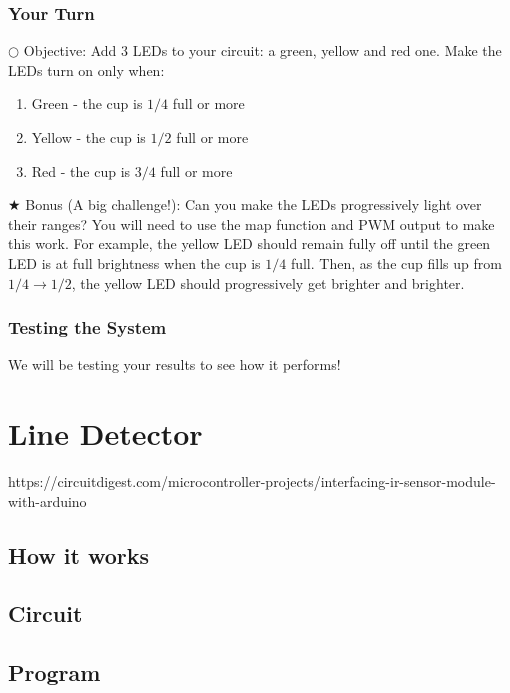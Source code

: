 \documentclass[12pt]{article}
\begin{document}
\subsubsection{Your Turn}

\noindent $\bigcirc$ Objective: Add 3 LEDs to your circuit: a green, yellow and red one. Make the LEDs turn on only when:
\begin{enumerate}
	\itemsep -1em
	\item Green - the cup is $1/4$ full or more
	\item Yellow - the cup is $1/2$ full or more
	\item Red - the cup is $3/4$ full or more
\end{enumerate}

\noindent $\bigstar$ Bonus (A big challenge!): Can you make the LEDs progressively light over their ranges? You will need to use the map function and PWM output to make this work. For example, the yellow LED should remain fully off until the green LED is at full brightness when the cup is $1/4$ full. Then, as the cup fills up from $1/4 \rightarrow 1/2$, the yellow LED should progressively get brighter and brighter.



\subsubsection{Testing the System}

We will be testing your results to see how it performs!








\section{Line Detector}

https://circuitdigest.com/microcontroller-projects/interfacing-ir-sensor-module-with-arduino




\subsection{How it works}

\subsection{Circuit}

\subsection{Program}
\end{document}
